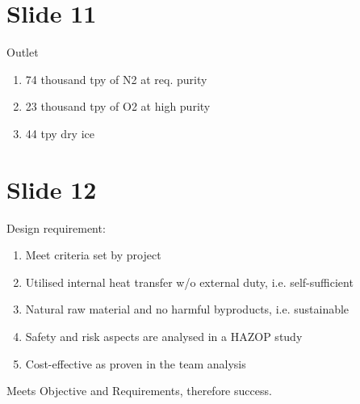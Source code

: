 \documentclass[11pt,oneside]{article}
\begin{document}
\section{Slide 11}
    Outlet
    \begin{enumerate}
        \item 74 thousand tpy of N2 at req. purity
        \item 23 thousand tpy of O2 at high purity
        \item 44 tpy dry ice
    \end{enumerate}
    
\section{Slide 12}
    Design requirement:
    \begin{enumerate}
        \item Meet criteria set by project
        \item Utilised internal heat transfer w/o external duty, i.e. self-sufficient
        \item Natural raw material and no harmful byproducts, i.e. sustainable
        \item Safety and risk aspects are analysed in a HAZOP study
        \item Cost-effective as proven in the team analysis
    \end{enumerate}
    Meets Objective and Requirements, therefore success.
\end{document}
